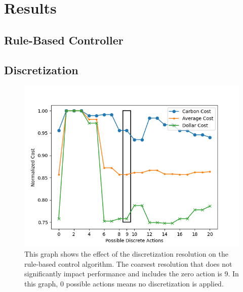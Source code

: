 \chapter{Results}
  \label{results}


\section{Rule-Based Controller}


\section{Discretization}
\begin{figure}[h]
  \centering
  \includegraphics[width=\figurewidth]{figures/discretization.png}
  \caption{This graph shows the effect of the discretization resolution on the rule-based control algorithm. The coarsest resolution that does not significantly impact performance and includes the zero action is 9. In this graph, 0 possible actions means no discretization is applied.}
  \label{fig:discretization}
\end{figure}

